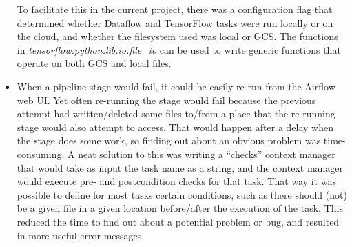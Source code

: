 \begin{itemize}
    To facilitate this in the current project, there was a configuration flag that determined whether Dataflow and TensorFlow tasks were run locally or on the cloud, and whether the filesystem used was local or GCS.
    The functions in \textit{tensorflow.python.lib.io.file\_io} can be used to write generic functions that operate on both GCS and local files.
  \item
    When a pipeline stage would fail, it could be easily re-run from the Airflow web UI.
    Yet often re-running the stage would fail because the previous attempt had written/deleted some files to/from a place that the re-running stage would also attempt to access.
    That would happen after a delay when the stage does some work, so finding out about an obvious problem was time-consuming.
    A neat solution to this was writing a ``checks'' context manager that would take as input the task name as a string, and the context manager would execute pre- and postcondition checks for that task.
    That way it was possible to define for most tasks certain conditions, such as there should (not) be a given  file in a given location before/after the execution of the task.
    This reduced the time to find out about a potential problem or bug, and resulted in more useful error messages.
\end{itemize}

